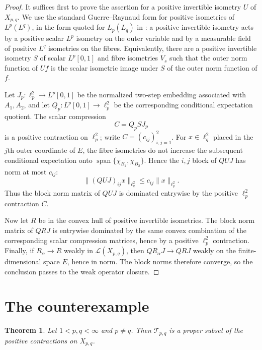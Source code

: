 \documentclass[11pt]{amsart}
\newtheorem{theorem}{Theorem}
\theoremstyle{remark}
\newcommand{\calT}{\mathcal T}
\newcommand{\calL}{\mathcal L}
\begin{document}
\begin{proof}
It suffices first to prove the assertion for a positive invertible isometry
$U$ of $X_{p,q}$.  We use the standard Guerre--Raynaud form for positive
isometries of $L^p(L^q)$, in the form quoted for $L_p(L_q)$ in
\cite[proof of Proposition 6.12]{CuthDeRancourtDoucha2024}: a positive
invertible isometry acts by a positive scalar $L^p$ isometry on the outer
variable and by a measurable field of positive $L^q$ isometries on the fibres.
Equivalently, there are a positive invertible isometry $S$ of scalar
$L^p[0,1]$ and fibre isometries $V_s$ such that the outer norm function of
$Uf$ is the scalar isometric image under $S$ of the outer norm function of $f$.

Let $J_p:\ell_p^2\to L^p[0,1]$ be the normalized two-step embedding associated
with $A_1,A_2$, and let $Q_p:L^p[0,1]\to\ell_p^2$ be the corresponding
conditional expectation quotient.  The scalar compression
\[
        C=Q_pSJ_p
\]
is a positive contraction on $\ell_p^2$; write $C=(c_{ij})_{i,j=1}^2$.
For $x\in\ell_q^2$ placed in the $j$th outer coordinate of $E$, the fibre
isometries do not increase the subsequent conditional expectation onto
$\operatorname{span}\{\chi_{B_1},\chi_{B_2}\}$.  Hence the $i,j$ block of
$QUJ$ has norm at most $c_{ij}$:
\[
        \|(QUJ)_{ij}x\|_{\ell_q^2}\le c_{ij}\|x\|_{\ell_q^2}.
\]
Thus the block norm matrix of $QUJ$ is dominated entrywise by the positive
$\ell_p^2$ contraction $C$.

Now let $R$ be in the convex hull of positive invertible isometries.  The
block norm matrix of $QRJ$ is entrywise dominated by the same convex
combination of the corresponding scalar compression matrices, hence by a
positive $\ell_p^2$ contraction.  Finally, if $R_\alpha\to R$ weakly in
$\calL(X_{p,q})$, then $QR_\alpha J\to QRJ$ weakly on the finite-dimensional
space $E$, hence in norm.  The block norms therefore converge, so the
conclusion passes to the weak operator closure.
\end{proof}

\section*{The counterexample}

\begin{theorem}
\label{thm:counterexample}
Let $1<p,q<\infty$ and $p\ne q$.  Then $\calT_{p,q}$ is a proper subset of
the positive contractions on $X_{p,q}$.
\end{theorem}
\end{document}
